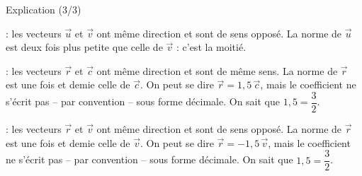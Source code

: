 \documentclass[border=4pt]{standalone}
\begin{document}
\begin{minipage}{16cm}\large \begin{minipage}{15.5cm}{\color{vert}\Large Explication (3/3)}\par{} : les vecteurs $\vec{u}$ et $\vec{v}$ ont même direction et sont de sens opposé. La norme de $\vec{u}$ est deux fois plus petite que celle de $\vec{v}$ : c'est la moitié.\par{} : les vecteurs $\vec{r}$ et $\vec{c}$ ont même direction et sont de même sens. La norme de $\vec{r}$ est une fois et demie celle de $\vec{c}$. On peut se dire $\vec{r}=1{,}5\,\vec{c}$, mais le coefficient ne s'écrit pas – par convention – sous forme décimale. On sait que $1{,}5=\dfrac32$.\par{} : les vecteurs $\vec{r}$ et $\vec{v}$ ont même direction et sont de sens opposé. La norme de $\vec{r}$ est une fois et demie celle de $\vec{v}$. On peut se dire $\vec{r}=-1{,}5\,\vec{v}$, mais le coefficient ne s'écrit pas – par convention – sous forme décimale. On sait que $1{,}5=\dfrac32$.\end{minipage}\end{minipage}
\end{document}
